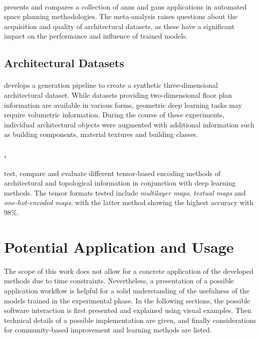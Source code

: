 \documentclass[a4paper, 12pt]{report}
\begin{document}
\paragraph{\cite{carta2021self}} presents and compares a collection of \acrshort{anns} and \acrshort{gans} applications in automated space planning methodologies. The meta-analysis raises questions about the acquisition and quality of architectural datasets, as these have a significant impact on the performance and influence of trained models.

\subsection*{Architectural Datasets}\label{subsec:architectural-datasets-fr}

\paragraph{\cite{fedorova2021synthetic}} develops a generation pipeline to create a synthetic three-dimensional architectural dataset. While datasets providing two-dimensional floor plan information are available in various forms, geometric deep learning tasks may require volumetric information. During the course of these experiments, individual architectural objects were augmented with additional information such as building components, material textures and building classes.

\paragraph{\cite{eisenstadt2021comparative}, } test, compare and evaluate different tensor-based encoding methods of architectural and topological information in conjunction with deep learning methods. The tensor formats tested include \textit{multilayer maps}, \textit{textual maps} and \textit{\gls{one-hot-encoded} maps}, with the latter method showing the highest accuracy with 98\%.

\section{Potential Application and Usage}\label{sec:potential-application-and-usage}

The scope of this work does not allow for a concrete application of the developed methods due to time constraints. Nevertheless, a presentation of a possible application workflow is helpful for a solid understanding of the usefulness of the models trained in the experimental phase. In the following sections, the possible software interaction is first presented and explained using visual examples. Then technical details of a possible implementation are given, and finally considerations for community-based improvement and learning methods are listed.
\end{document}
